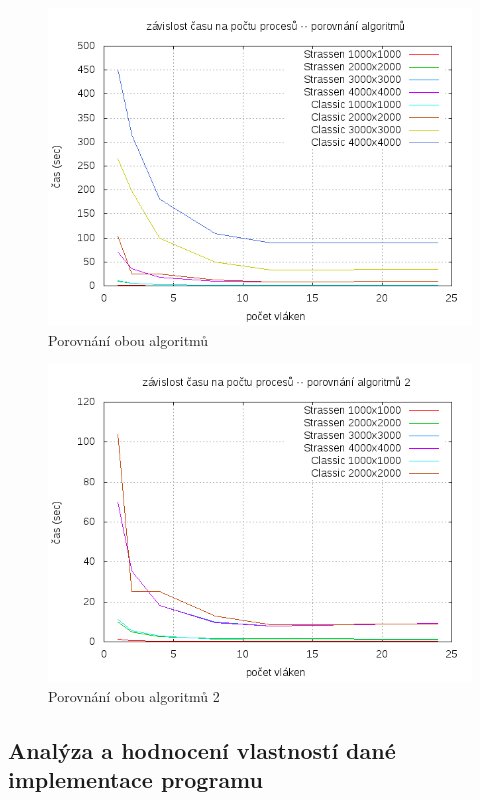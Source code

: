 \documentclass[12pt,a4paper]{article}
\begin{document}
\begin{figure}[h]
\includegraphics[width=\textwidth]{graph/classic-vs-strassen.png}
\caption{Porovnání obou algoritmů}
\label{data4}
\end{figure}

\pagebreak
\begin{figure}[h]
\includegraphics[width=\textwidth]{graph/classic-vs-strassen-2.png}
\caption{Porovnání obou algoritmů 2}
\label{data4}
\end{figure}



\pagebreak
\subsection{Analýza a hodnocení vlastností dané implementace programu}
\end{document}

